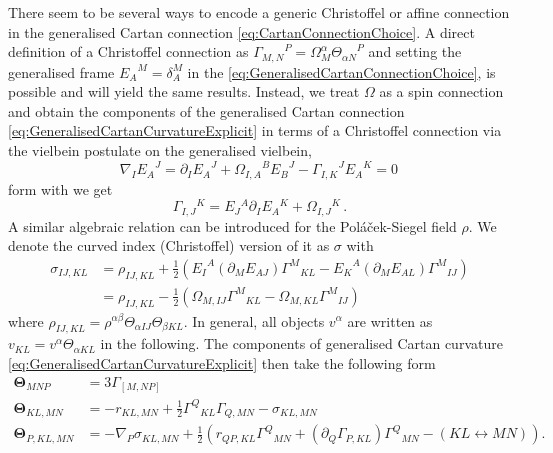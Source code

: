 \documentclass[11pt,a4paper]{article}
\numberwithin{equation}{section}
\begin{document}
There seem to be several ways to encode a generic Christoffel or affine connection in the generalised Cartan connection \eqref{eq:CartanConnectionChoice}. A direct definition of a Christoffel connection as ${\Gamma_{M,N}}^P = \Omega_M^\alpha {\Theta_{\alpha N}}^P$ and setting the generalised frame ${E_A}^M = \delta_A^M$ in the \eqref{eq:GeneralisedCartanConnectionChoice}, is possible and will yield the same results. Instead, we treat $\Omega$ as a spin connection and obtain the components of the generalised Cartan connection \eqref{eq:GeneralisedCartanCurvatureExplicit} in terms of a Christoffel connection via the vielbein postulate on the generalised vielbein, 
\begin{equation}
\nabla_I {E_A}^J = \partial_I {E_A}^J + {\Omega_{I,A}}^B {E_B}^J - {\Gamma_{I,K}}^J {E_A}^K = 0 \label{eq:VielbeinPostulate}\,
\end{equation}
form with we get
\begin{equation}
  \Gamma_{I,J}{}^K = E_J{}^A \partial_I E_A{}^K +  \Omega_{I,J}{}^K \,. 
\end{equation}
A similar algebraic relation can be introduced for the Poláček-Siegel field $\rho$. We denote the curved index (Christoffel) version of it as $\sigma$ with
\begin{align}
\sigma_{IJ,KL} &= \rho_{IJ,KL} + \frac{1}{2} \left( {E_I}^A (\partial_M E_{AJ})  {\Gamma^M}_{KL} - {E_K}^A (\partial_M E_{AL})  {\Gamma^M}_{IJ} \right) \nonumber \\
&= \rho_{IJ,KL} - \frac{1}{2} \left( \Omega_{M,IJ} {\Gamma^M}_{KL} - {\Omega_{M,KL}}  {\Gamma^M}_{IJ} \right) \label{eq:VielbeinPostulateRho}
\end{align}
where $\rho_{IJ,KL} = \rho^{\alpha \beta} {\Theta_{\alpha IJ}} {\Theta_{\beta KL}}$. In general, all objects $v^\alpha$ are written as $v_{KL} = v^\alpha \Theta_{\alpha KL}$ in the following. The components of generalised Cartan curvature \eqref{eq:GeneralisedCartanCurvatureExplicit} then take the following form
\begin{align}
\mathbf{\Theta}_{MNP} &= 3 \Gamma_{[M,NP]} \nonumber \\
\mathbf{\Theta}_{KL,MN} &= - r_{KL,MN} + \frac{1}{2} {\Gamma^Q}_{KL} \Gamma_{Q,MN} - \sigma_{KL,MN} \label{eq:GeneralisedCartanCurvatureGenMetric}\\
\mathbf{\Theta}_{P,KL,MN} &= - \nabla_P \sigma_{KL,MN} + \frac{1}{2}  \left( r_{QP,KL} {\Gamma^Q}_{MN} + (\partial_Q \Gamma_{P,KL}) {\Gamma^Q}_{MN} - (KL \leftrightarrow MN) \right). \nonumber
\end{align}
\end{document}
